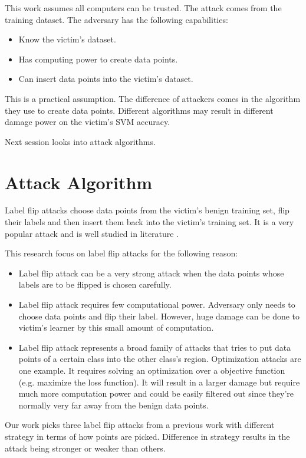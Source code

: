 \documentclass[10pt,conference,compsocconf,letterpaper]{IEEEtran}
\begin{document}
This work assumes all computers can be trusted. The attack comes from the training dataset. The adversary has the following capabilities:

\begin{itemize}
\item Know the victim's dataset. 
\item Has computing power to create data points.
\item Can insert data points into the victim's dataset.
\end{itemize}

This is a practical assumption. The difference of attackers comes in the algorithm they use to create data points. Different algorithms may result in different damage power on the victim's SVM accuracy.

Next session looks into attack algorithms.


\section{Attack Algorithm}

Label flip attacks choose data points from the victim's benign training set, flip their labels and then insert them back into the victim's training set. It is a very popular attack and is well studied in literature \cite{xiao12}. 

This research focus on label flip attacks for the following reason:

\begin{itemize}
\item Label flip attack can be a very strong attack when the data points whose labels are to be flipped is chosen carefully.
\item Label flip attack requires few computational power. Adversary only needs to choose data points and flip their label. However, huge damage can be done to victim's learner by this small amount of computation. 
\item Label flip attack represents a broad family of attacks that tries to put data points of a certain class into the other class's region. Optimization attacks are one example. It requires solving an optimization over a objective function (e.g. maximize the loss function). It will result in a larger damage but require much more computation power and could be easily filtered out since they're normally very far away from the benign data points.
\end{itemize}

Our work picks three label flip attacks from a previous work with different strategy in terms of how points are picked. Difference in strategy results in the attack being stronger or weaker than others.
\end{document}
